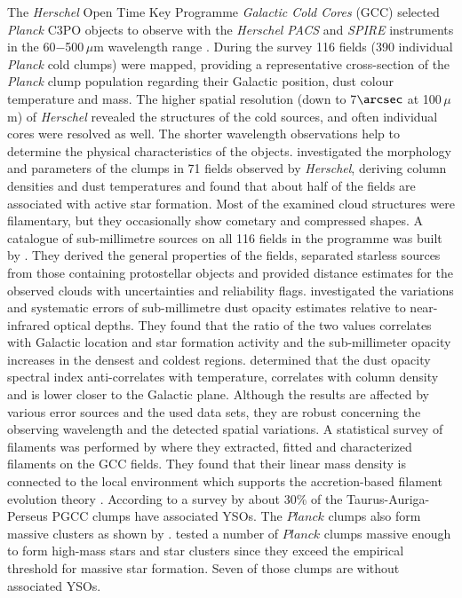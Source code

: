 \documentclass[printer]{aa}
\begin{document}
The \textit{Herschel} Open Time Key Programme \textit{Galactic Cold Cores} (GCC) selected \textit{Planck} C3PO objects to observe with the \textit{Herschel} \textit{PACS} and \textit{SPIRE} instruments in the 60$-$500\,$\mu$m wavelength range \citep{poglitsch2010, griffin2010}. During the survey 116 fields (390 individual \textit{Planck} cold clumps) were mapped, providing a representative cross-section of the \textit{Planck} clump population regarding their Galactic position, dust colour temperature and mass. The higher spatial resolution (down to 7$\arcsec$ at 100\,$\mu$m) of \textit{Herschel} \citep{pilbratt2010} revealed the structures of the cold sources, and often individual cores were resolved as well. The shorter wavelength observations help to determine the physical characteristics of the objects. \citet{juvela2012} investigated the morphology and parameters of the clumps in 71 fields observed by \textit{Herschel}, deriving column densities and dust temperatures and found that about half of the fields are associated with active star formation. Most of the examined cloud structures were filamentary, but they occasionally show cometary and compressed shapes. A catalogue of sub-millimetre sources on all 116 fields in the programme was built by \citet{montillaud2015}. They derived the general properties of the fields, separated starless sources from those containing protostellar objects and provided distance estimates for the observed clouds with uncertainties and reliability flags. \citet{juvela2015b} investigated the variations and systematic errors of sub-millimetre dust opacity estimates relative to near-infrared optical depths. They found that the ratio of the two values correlates with Galactic location and star formation activity and the sub-millimeter opacity increases in the densest and coldest regions. \citet{juvela2015a} determined that the dust opacity spectral index anti-correlates with temperature, correlates with column density and is lower closer to the Galactic plane. Although the results are affected by various error sources and the used data sets, they are robust concerning the observing wavelength and the detected spatial variations. A statistical survey of filaments was performed by \citet{rivera2016} where they extracted, fitted and characterized filaments on the GCC fields. They found that their linear mass density is connected to the local environment which supports the accretion-based filament evolution theory \citep{arzoumanian2011, palmeirim2013}. According to a survey by \citet{toth2016} about 30\% of the Taurus-Auriga-Perseus PGCC clumps have associated YSOs. The $Planck$ clumps also form massive clusters as shown by \citet{toth2017}. \citet{zahorecz2016} tested a number of $Planck$ clumps massive enough to form high-mass stars and star clusters since they exceed the empirical threshold for massive star formation. Seven of those clumps are without associated YSOs.
\end{document}
